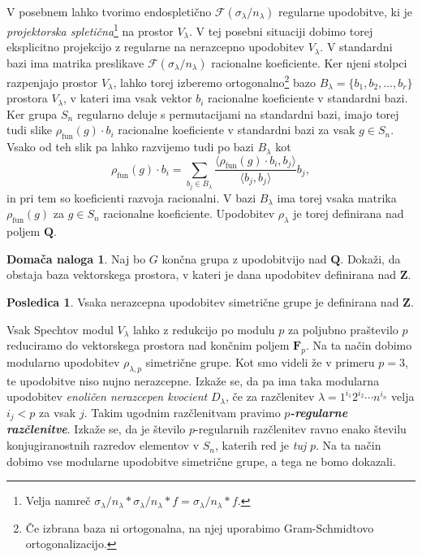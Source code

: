 \documentclass[11pt]{book}
\def\ZZ{\mathbf{Z}}
\def\QQ{\mathbf{Q}}
\def\FF{\mathbf{F}}
\def\Fcal{\mathcal{F}}
\def\youngsym{\sigma_{\lambda}}
\DeclareMathOperator\fun{fun}
\def\definicija{\color{rdeca}\bf\em}
\theoremstyle{definition}
\theoremstyle{zgled}
\theoremstyle{odprtproblem}
\theoremstyle{domacanaloga}
\newtheorem*{domacanaloga}{Domača naloga}
\theoremstyle{izrek}
\newtheorem*{posledica}{Posledica}
\begin{document}
V posebnem lahko tvorimo endospletično $\Fcal(\youngsym / n_{\lambda})$ regularne upodobitve, ki je \emph{projektorska spletična}\footnote{Velja namreč $\youngsym/n_{\lambda} * \youngsym/n_{\lambda} * f = \youngsym/n_{\lambda} * f$.} na prostor $V_{\lambda}$. V tej posebni situaciji dobimo torej eksplicitno projekcijo z regularne na nerazcepno upodobitev $V_{\lambda}$. V standardni bazi ima matrika preslikave $\Fcal(\youngsym/n_{\lambda})$ racionalne koeficiente. Ker njeni stolpci razpenjajo prostor $V_{\lambda}$, lahko torej izberemo ortogonalno\footnote{Če izbrana baza ni ortogonalna, na njej uporabimo Gram-Schmidtovo ortogonalizacijo.} bazo $B_{\lambda} = \{ b_1, b_2, \dots, b_r \}$ prostora $V_{\lambda}$, v kateri ima vsak vektor $b_i$ racionalne koeficiente v standardni bazi. Ker grupa $S_n$ regularno deluje s permutacijami na standardni bazi, imajo torej tudi slike $\rho_{\fun}(g) \cdot b_i$ racionalne koeficiente v standardni bazi za vsak $g \in S_n$. Vsako od teh slik pa lahko razvijemo tudi po bazi $B_{\lambda}$ kot
\[
    \rho_{\fun}(g) \cdot b_i
    = \sum_{b_j \in B_{\lambda}} \frac{\langle \rho_{\fun}(g) \cdot b_i, b_j \rangle}{\langle b_j, b_j \rangle} b_j,
\]
in pri tem so koeficienti razvoja racionalni. V bazi $B_{\lambda}$ ima torej vsaka matrika $\rho_{\fun}(g)$ za $g \in S_n$ racionalne koeficiente. Upodobitev $\rho_{\lambda}$ je torej definirana nad poljem $\QQ$.

\begin{domacanaloga}
Naj bo $G$ končna grupa z upodobitvijo nad $\QQ$. Dokaži, da obstaja baza vektorskega prostora, v kateri je dana upodobitev definirana nad $\ZZ$.
\end{domacanaloga}

\begin{posledica}
Vsaka nerazcepna upodobitev simetrične grupe je definirana nad $\ZZ$.
\end{posledica}    

Vsak Spechtov modul $V_{\lambda}$ lahko z redukcijo po modulu $p$ za poljubno praštevilo $p$ reduciramo do vektorskega prostora nad končnim poljem $\FF_p$. Na ta način dobimo modularno upodobitev $\rho_{\lambda,p}$ simetrične grupe. Kot smo videli že v primeru $p = 3$, te upodobitve niso nujno nerazcepne. Izkaže se, da pa ima taka modularna upodobitev \emph{enoličen nerazcepen kvocient} $D_{\lambda}$, če za razčlenitev $\lambda = 1^{i_1} 2^{i_2} \cdots n^{i_n}$ velja $i_j < p$ za vsak $j$. Takim ugodnim razčlenitvam pravimo {\definicija $p$-regularne razčlenitve}. Izkaže se, da je število $p$-regularnih razčlenitev ravno enako številu konjugiranostnih razredov elementov v $S_n$, katerih red je \emph{tuj} $p$. Na ta način dobimo vse modularne upodobitve simetrične grupe, a tega ne bomo dokazali.
\end{document}
